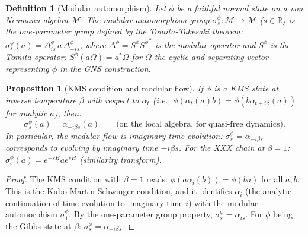 \documentclass[12pt,a4paper]{article}
\newtheorem{proposition}[theorem]{Proposition}
\newtheorem{definition}[theorem]{Definition}
\newcommand{\RR}{\mathbb{R}}
\newcommand{\vN}{\mathcal{M}}      %
\begin{document}
\begin{definition}[Modular automorphism]\label{def:modular}
Let $\phi$ be a faithful normal state on a von Neumann algebra $\vN$.
The \emph{modular automorphism group} $\sigma^\phi_s:\vN\to\vN$ ($s\in\RR$)
is the one-parameter group defined by the Tomita-Takesaki theorem:
$\sigma^\phi_s(a) = \Delta^\phi_{is}\,a\,\Delta^\phi_{-is}$,
where $\Delta^\phi = S^\phi{S^\phi}^*$ is the modular operator and
$S^\phi$ is the Tomita operator: $S^\phi(a\Omega)=a^*\Omega$ for $\Omega$ the
cyclic and separating vector representing $\phi$ in the GNS construction.
\end{definition}

\begin{proposition}[KMS condition and modular flow]\label{prop:kms_modular}
If $\phi$ is a KMS state at inverse temperature $\beta$ with respect to $\alpha_t$
(i.e., $\phi(\alpha_t(a)b)=\phi(b\alpha_{t+i\beta}(a))$ for analytic $a$), then:
\begin{equation}\label{eq:kms_modular}
  \sigma^\phi_s(a) = \alpha_{-i\beta s}(a)
  \qquad\text{(on the local algebra, for quasi-free dynamics).}
\end{equation}
In particular, the modular flow is \emph{imaginary-time evolution}:
$\sigma^\phi_s = \alpha_{-i\beta s}$ corresponds to evolving by imaginary time $-i\beta s$.
For the XXX chain at $\beta=1$: $\sigma^\phi_s(a) = e^{-sH}ae^{sH}$ (similarity transform).
\end{proposition}

\begin{proof}
The KMS condition with $\beta=1$ reads: $\phi(a\alpha_i(b))=\phi(ba)$ for all $a,b$.
This is the Kubo-Martin-Schwinger condition, and it identifies $\alpha_i$ (the analytic continuation
of time evolution to imaginary time $i$) with the modular automorphism $\sigma^\phi_1$.
By the one-parameter group property, $\sigma^\phi_s=\alpha_{is}$.
For $\phi$ being the Gibbs state at $\beta$: $\sigma^\phi_s=\alpha_{-i\beta s}$.
\end{proof}
\end{document}

